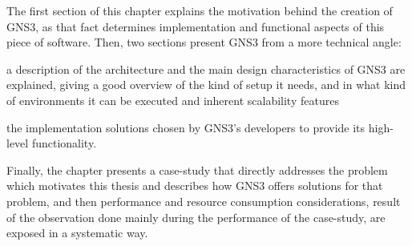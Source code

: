 

The first section of this chapter explains the motivation behind the creation of GNS3, as that fact determines implementation and functional aspects of this piece of software.
Then, two sections present GNS3 from a more technical angle:
  \begin{enumerate*}[label=(\roman*), itemjoin={{, }}, itemjoin*={{, and }}]
  \item a description of the architecture and the main design characteristics of GNS3 are explained, giving a good overview of the kind of setup it needs, and in what kind of environments it can be executed and inherent scalability features
  \item the implementation solutions chosen by GNS3's developers to provide its high-level functionality.
  \end{enumerate*}
Finally, the chapter presents a case-study that directly addresses the problem which motivates this thesis and describes how GNS3 offers solutions for that problem, and then performance and resource consumption considerations, result of the observation done mainly during the performance of the case-study, are exposed in a systematic way.











